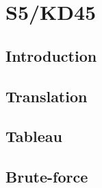 \chapter{S5/KD45}

\section{Introduction}

\section{Translation}

\section{Tableau}

\section{Brute-force}
